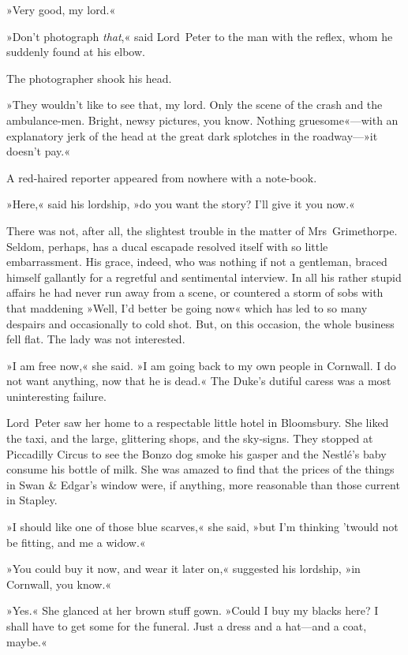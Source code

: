 »Very good, my lord.«

»Don't photograph \textit{that},« said Lord~Peter to the man with the reflex, whom he suddenly found at his elbow.

The photographer shook his head.

»They wouldn't like to see that, my lord. Only the scene of the crash and the ambulance-men. Bright, newsy pictures, you know. Nothing gruesome«—with an explanatory jerk of the head at the great dark splotches in the roadway—»it doesn't pay.«

A red-haired reporter appeared from nowhere with a note-book.

»Here,« said his lordship, »do you want the story? I'll give it you now.« 

\divider

There was not, after all, the slightest trouble in the matter of Mrs~Grimethorpe. Seldom, perhaps, has a ducal escapade resolved itself with so little embarrassment. His grace, indeed, who was nothing if not a gentleman, braced himself gallantly for a regretful and sentimental interview. In all his rather stupid affairs he had never run away from a scene, or countered a storm of sobs with that maddening »Well, I'd better be going now« which has led to so many despairs and occasionally to cold shot. But, on this occasion, the whole business fell flat. The lady was not interested.

»I am free now,« she said. »I am going back to my own people in Cornwall. I do not want anything, now that he is dead.« The Duke's dutiful caress was a most uninteresting failure.

Lord~Peter saw her home to a respectable little hotel in Bloomsbury.  She liked the taxi, and the large, glittering shops, and the sky-signs.  They stopped at Piccadilly Circus to see the Bonzo dog smoke his gasper and the Nestlé's baby consume his bottle of milk. She was amazed to find that the prices of the things in Swan \& Edgar's window were, if anything, more reasonable than those current in Stapley.

»I should like one of those blue scarves,« she said, »but I'm thinking 'twould not be fitting, and me a widow.«

»You could buy it now, and wear it later on,« suggested his lordship, »in Cornwall, you know.«

»Yes.« She glanced at her brown stuff gown. »Could I buy my blacks here? I shall have to get some for the funeral. Just a dress and a hat—and a coat, maybe.«

